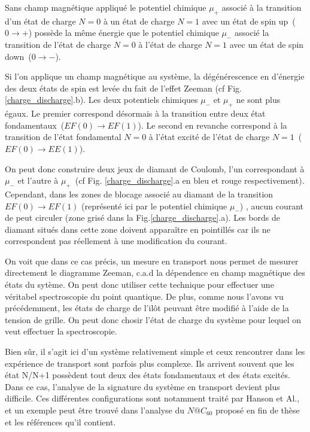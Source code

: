 Sans champ magnétique appliqué le potentiel chimique $\mu_{+}$ associé à la transition d'un état de charge $N=0$ à un état de charge $N=1$ avec un état de spin up~($0\rightarrow +$) possède la m\^eme énergie que le potentiel chimique  $\mu_{-}$ associé la transition de l'état de charge $N=0$ à l'état de charge $N=1$ avec un état de spin down~($0\rightarrow -$).


Si l'on applique un champ magnétique au système, la dégénérescence en d'énergie des deux états de spin est levée du fait de l'effet Zeeman (cf Fig. \ref{charge_discharge}.b). Les deux potentiels chimiques $\mu_{-}$ et $\mu_{+}$ ne sont plus égaux. Le premier correspond désormais à la transition entre deux état fondamentaux~($EF(0)\rightarrow EF(1)$). Le second en revanche correspond à la transition de l'état fondamental $N=0$ à l'état excité de l'état de charge $N=1$~($EF(0)\rightarrow EE(1)$).

On peut donc construire deux jeux de diamant de Coulomb, l'un correspondant à $\mu_{-}$ et l'autre à $\mu_{+}$~(cf Fig. \ref{charge_discharge}.a en bleu et rouge respectivement). Cependant, dans les zones de blocage associé au diamant de la transition $EF(0)\rightarrow EF(1)$ (représenté ici par le potentiel chimique $\mu_{-}$) , aucun courant de peut circuler (zone grisé dans la Fig.\ref{charge_discharge}.a). Les bords de diamant situés dans cette zone doivent apparaître en pointillés car ils ne correspondent pas réellement à une modification du courant.

On voit que dans ce cas précis, un mesure en transport nous permet de mesurer directement le diagramme Zeeman, c.a.d la dépendence en champ magnétique des états du sytème. On peut donc utiliser cette technique pour effectuer une véritabel spectroscopie du point quantique. De plus, comme nous l'avons vu précédemment, les états de charge de l'il\^ot peuvant \^etre modifié à l'aide de la tension de grille. On peut donc chosir l'état de charge du système pour lequel on veut effectuer la spectroscopie.

 Bien s\^ur, il s'agit ici d'un système relativement simple et ceux rencontrer dans les expérience de transport sont parfois plus complexe. Ils arrivent souvent que les état N/N+1 possèdent tout deux des états fondamentaux et des états excités. Dans ce cas, l'analyse de la signature du système en transport devient plus difficile. Ces différentes configurations sont notamment traité par Hanson et Al., et un exemple peut \^etre trouvé dans l'analyse du $N@C_{60}$ proposé en fin de thèse et les références qu'il contient.

